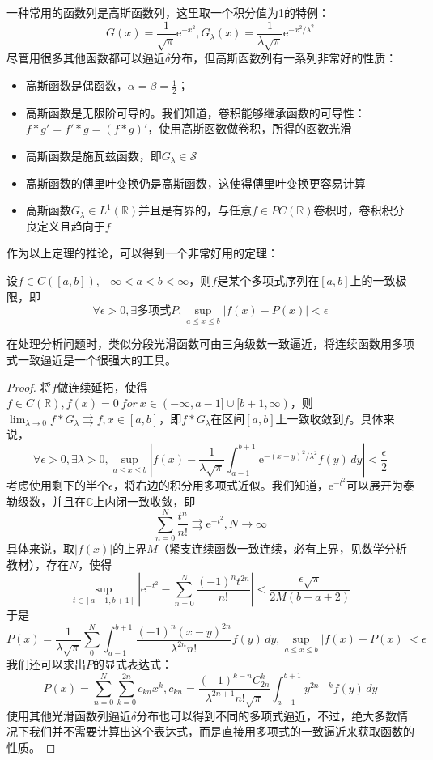 一种常用的函数列是高斯函数列，这里取一个积分值为1的特例：
\[G(x)=\frac{1}{\sqrt{\pi}}\mathrm{e}^{-x^2},G_\lambda(x)=\frac{1}{\lambda\sqrt{\pi}}\mathrm{e}^{-x^2/\lambda^2}\]
尽管用很多其他函数都可以逼近$\delta$分布，但高斯函数列有一系列非常好的性质：\begin{itemize}
    \item 高斯函数是偶函数，$\alpha=\beta=\frac{1}{2}$；
    \item 高斯函数是无限阶可导的。我们知道，卷积能够继承函数的可导性：$f*g'=f'*g=(f*g)'$，使用高斯函数做卷积，所得的函数光滑
    \item 高斯函数是施瓦兹函数，即$G_\lambda\in \mathcal{S}$
    \item 高斯函数的傅里叶变换仍是高斯函数，这使得傅里叶变换更容易计算
    \item 高斯函数$G_\lambda\in L^1(\mathbb{R})$并且是有界的，与任意$f\in PC(\mathbb{R})$卷积时，卷积积分良定义且趋向于$f$
\end{itemize}

作为以上定理的推论，可以得到一个非常好用的定理：\begin{corollary}[*魏尔斯特拉斯逼近定理]
    设$f\in C([a,b]),-\infty<a<b<\infty$，则$f$是某个多项式序列在$[a,b]$上的一致极限，即\[\forall \epsilon>0,\exists \text{多项式}P,\sup_{a\leq x\leq b}|f(x)-P(x)|<\epsilon\]
\end{corollary}
在处理分析问题时，类似分段光滑函数可由三角级数一致逼近，将连续函数用多项式一致逼近是一个很强大的工具。
\begin{proof}
    将$f$做连续延拓，使得$f\in C(\mathbb{R}),f(x)=0\ for\ x\in (-\infty,a-1]\cup[b+1,\infty)$，则$\lim_{\lambda\to 0}f*G_\lambda \rightrightarrows f,x\in[a,b]$，即$f*G_\lambda$在区间$[a,b]$上一致收敛到$f$。具体来说，
    \[\forall \epsilon>0,\exists \lambda>0,\sup_{a\leq x\leq b}\left|f(x)-\frac{1}{\lambda\sqrt{\pi}}\int_{a-1}^{b+1}\mathrm{e}^{-(x-y)^2/\lambda^2}f(y)\,dy\right|<\frac{\epsilon}{2}\]
    考虑使用剩下的半个$\epsilon$，将右边的积分用多项式近似。我们知道，$\mathrm{e}^{-t^2}$可以展开为泰勒级数，并且在$\mathbb{C}$上内闭一致收敛，即
    \[\sum_{n=0}^{N}\frac{t^n}{n!}\rightrightarrows \mathrm{e}^{-t^2},N\to\infty\]
    具体来说，取$|f(x)|$的上界$M$（紧支连续函数一致连续，必有上界，见数学分析教材），存在$N$，使得
    \[\sup_{t\in[a-1,b+1]}\left|\mathrm{e}^{-t^2}-\sum_{n=0}^{N}\frac{(-1)^n t^{2n}}{n!}\right|<\frac{\epsilon\sqrt{\pi}}{2M(b-a+2)}\]
    于是
    \[P(x)=\frac{1}{\lambda\sqrt{\pi}}\sum_{0}^{N}\int_{a-1}^{b+1}\frac{(-1)^n (x-y)^{2n}}{\lambda^{2n}n!}f(y)\,dy,\sup_{a\leq x\leq b}\left|f(x)-P(x)\right|<\epsilon\]
    我们还可以求出$P$的显式表达式：
    \[P(x)=\sum_{n=0}^{N}\sum_{k=0}^{2n}c_{kn}x^k,c_{kn}=\frac{(-1)^{k-n}C_{2n}^{k}}{\lambda^{2n+1}n!\sqrt{\pi}}\int_{a-1}^{b+1}y^{2n-k}f(y)\,dy\]
    使用其他光滑函数列逼近$\delta$分布也可以得到不同的多项式逼近，不过，绝大多数情况下我们并不需要计算出这个表达式，而是直接用多项式的一致逼近来获取函数的性质。
\end{proof}

